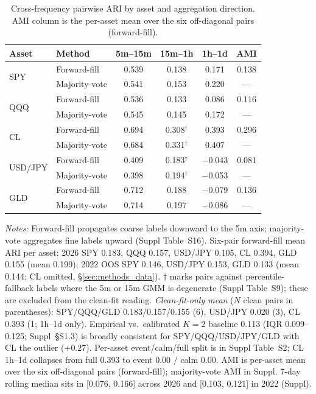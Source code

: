 \documentclass[preprint,12pt,authoryear]{elsarticle}
\newcommand{\CL}{CL}
\begin{document}
\begin{table}[!htbp]
\centering
\small
\setlength{\tabcolsep}{4pt}
\caption{Cross-frequency pairwise ARI by asset and aggregation direction. AMI column is the per-asset mean over the six off-diagonal pairs (forward-fill).}
\label{tab:cross_freq}
\begin{tabular}{llcccc}
\toprule
Asset & Method & 5m--15m & 15m--1h & 1h--1d & AMI \\
\midrule
\multirow{2}{*}{SPY}
  & Forward-fill  & 0.539 & 0.138            & 0.171    & 0.138 \\
  & Majority-vote & 0.541 & 0.153            & 0.220    & ---   \\[3pt]
\multirow{2}{*}{QQQ}
  & Forward-fill  & 0.536 & 0.133            & 0.086    & 0.116 \\
  & Majority-vote & 0.545 & 0.145            & 0.172    & ---   \\[3pt]
\multirow{2}{*}{CL}
  & Forward-fill  & 0.694 & 0.308$^\dagger$  & 0.393    & 0.296 \\
  & Majority-vote & 0.684 & 0.331$^\dagger$  & 0.407    & ---   \\[3pt]
\multirow{2}{*}{USD/JPY}
  & Forward-fill  & 0.409 & 0.183$^\dagger$  & $-$0.043 & 0.081 \\
  & Majority-vote & 0.398 & 0.194$^\dagger$  & $-$0.053 & ---   \\[3pt]
\multirow{2}{*}{GLD}
  & Forward-fill  & 0.712 & 0.188            & $-$0.079 & 0.136 \\
  & Majority-vote & 0.714 & 0.197            & $-$0.086 & ---   \\
\bottomrule
\end{tabular}
\par\medskip
{\footnotesize\justifying
\textit{Notes:} Forward-fill propagates coarse labels downward to the 5m axis; majority-vote aggregates fine labels upward (Suppl Table~S16). Six-pair forward-fill mean ARI per asset: 2026 SPY 0.183, QQQ 0.157, USD/JPY 0.105, CL 0.394, GLD 0.155 (mean 0.199); 2022 OOS SPY 0.146, USD/JPY 0.153, GLD 0.133 (mean 0.144; \CL{} omitted, \S\ref{sec:methods_data}). $\dagger$ marks pairs against percentile-fallback labels where the 5m or 15m GMM is degenerate (Suppl Table~S9); these are excluded from the clean-fit reading. \emph{Clean-fit-only mean} ($N$ clean pairs in parentheses): SPY/QQQ/GLD 0.183/0.157/0.155 (6), USD/JPY 0.020 (3), CL 0.393 (1; 1h--1d only). Empirical vs.\ calibrated $K{=}2$ baseline 0.113 (IQR 0.099--0.125; Suppl~\S{}S1.3) is broadly consistent for SPY/QQQ/USD/JPY/GLD with CL the outlier ($+0.27$). Per-asset event/calm/full split is in Suppl Table~S2; CL 1h--1d collapses from full 0.393 to event 0.00 / calm 0.00. AMI is per-asset mean over the six off-diagonal pairs (forward-fill); majority-vote AMI in Suppl. 7-day rolling median sits in [0.076, 0.166] across 2026 and [0.103, 0.121] in 2022 (Suppl).
\par}
\end{table}
\end{document}
